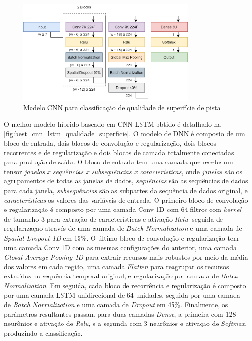 \begin{figure}[h!]
  \centering
  \caption{Modelo CNN para classificação de qualidade de superfície de pista}
  \label{fig:best_cnn_qualidade_superficie}
  \includegraphics[width=0.8\textwidth]{figuras/fig_48.png}
\end{figure}

O melhor modelo híbrido baseado em CNN-LSTM obtido é detalhado na \autoref{fig:best_cnn_lstm_qualidade_superficie}. O modelo de DNN é composto de um bloco de entrada, dois blocos de convolução e regularização, dois blocos recorrentes e de regularização e dois blocos de camada totalmente conectadas para produção de saída. O bloco de entrada tem uma camada que recebe um tensor \emph{janelas x sequências x subsequências x características}, onde \emph{janelas} são os agrupamentos de todas as janelas de dados, \emph{sequências} são as sequências de dados para cada janela, \emph{subsequências} são as subpartes da sequência de dados original, e \emph{características} os valores das variáveis de entrada. O primeiro bloco de convolução e regularização é composto por uma camada Conv 1D com 64 filtros com \textit{kernel} de tamanho 3 para extração de características e ativação \textit{Relu}, seguida de regularização através de uma camada de \textit{Batch Normalization} e uma camada de \textit{Spatial Dropout 1D} em 15\%. O último bloco de convolução e regularização tem uma camada Conv 1D com as mesmas configurações do anterior, uma camada \textit{Global Average Pooling 1D} para extrair recursos mais robustos por meio da média dos valores em cada região, uma camada \textit{Flatten} para reagrupar os recursos extraídos no sequência temporal original, e regularização por camada de \textit{Batch Normalization}. Em seguida, cada bloco de recorrência e regularização é composto por uma camada LSTM unidirecional de 64 unidades, seguida por uma camada de \textit{Batch Normalization} e uma camada de \textit{Dropout} em 45\%. Finalmente, os parâmetros resultantes passam para duas camadas \textit{Dense}, a primeira com 128 neurônios e ativação de \textit{Relu}, e a segunda com 3 neurônios e ativação de \textit{Softmax}, produzindo a classificação. 

